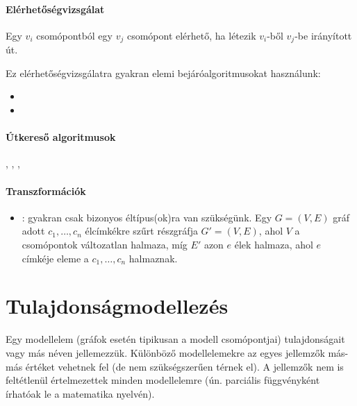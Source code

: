 \paragraph{Elérhetőségvizsgálat}

Egy $v_i$ csomópontból egy $v_j$ csomópont elérhető, ha létezik $v_i$-ből $v_j$-be irányított út.

Ez elérhetőségvizsgálatra gyakran elemi bejáróalgoritmusokat használunk:

\begin{itemize}
\item {}
\item {}
\end{itemize}

\paragraph{Útkereső algoritmusok}

, , , 


\paragraph{Transzformációk}

\begin{itemize}
\item {}: gyakran csak bizonyos éltípus(ok)ra van szükségünk. Egy $G = (V, E)$ gráf adott $c_1, \dots, c_n$ élcímkékre szűrt részgráfja $G' = (V, E)$, ahol $V$ a csomópontok változatlan halmaza, míg $E'$ azon $e$ élek halmaza, ahol $e$ címkéje eleme a $c_1, \dots, c_n$ halmaznak.
\end{itemize}



\section{Tulajdonságmodellezés}

Egy modellelem (gráfok esetén tipikusan a modell csomópontjai) tulajdonságait  vagy más néven  jellemezzük. Különböző modellelemekre az egyes jellemzők más-más értéket vehetnek fel (de nem szükségszerűen térnek el). A jellemzők nem is feltétlenül értelmezettek minden modellelemre (ún. parciális függvényként írhatóak le a matematika nyelvén).

